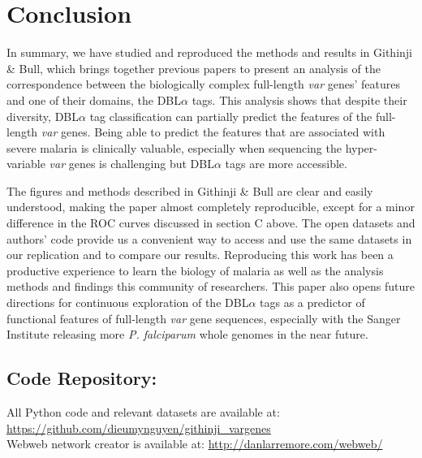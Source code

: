 \documentclass[10pt,twocolumn,superscriptaddress]{revtex4-1}
\newcommand{\var}{{\it var}\xspace}
\newcommand{\pf}{{\it P. falciparum}\xspace}
\newcommand{\dbla}{{DBL$\alpha$}\xspace}
\newcommand{\paper}{{Githinji \& Bull}\xspace}
\begin{document}
\section{Conclusion}
In summary, we have studied and reproduced the methods and results in \paper, which brings together previous papers to present an analysis of the correspondence between the biologically complex full-length \var genes' features and one of their domains, the \dbla tags. This analysis shows that despite their diversity, \dbla tag classification can partially predict the features of the full-length \var genes. Being able to predict the features that are associated with severe malaria is clinically valuable, especially when sequencing the hyper-variable \var genes is challenging but \dbla tags are more accessible. 

The figures and methods described in \paper are clear and easily understood, making the paper almost completely reproducible, except for a minor difference in the ROC curves discussed in section C above. The open datasets and authors' code provide us a convenient way to access and use the same datasets in our replication and to compare our results. Reproducing this work has been a productive experience to learn the biology of malaria as well as the analysis methods and findings this community of researchers. This paper also opens future directions for continuous exploration of the \dbla tags as a predictor of functional features of full-length \var gene sequences, especially with the Sanger Institute releasing more \pf whole genomes in the near future. 

\subsection*{Code Repository:}
\noindent All Python code and relevant datasets are available at: \url{https://github.com/dieumynguyen/githinji_vargenes} \\

\noindent Webweb network creator is available at: \url{http://danlarremore.com/webweb/}


\nocite{*}

 
\end{document}
